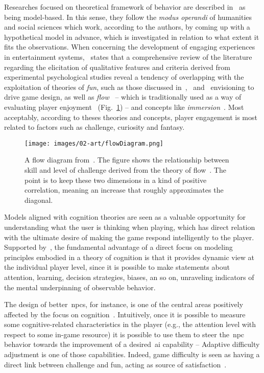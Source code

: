 Researches focused on theoretical framework of behavior are described in~\cite{yannakakis_player_2013} as being model-based. In this sense, they follow the \textit{modus operandi} of humanities and social sciences which work, according to the authors, by coming up with a hypothetical model in advance, which is investigated in relation to what extent it fits the observations. When concerning the development of engaging experiences in entertainment systems,~\cite{yannakakis_how_2008} states that a comprehensive review of the literature regarding the elicitation of qualitative features and criteria derived from experimental psychological studies reveal a tendency of overlapping with the exploitation of theories of \textit{fun}, such as those discussed in~\cite{malone_what_1980},~\cite{lazzaro_why_2004} and~\cite{koster_theory_2013} envisioning to drive game design, as well as \textit{flow}~\citep{csikszentmihalyi_flow:_1991} -- which is traditionally used as a way of evaluating player enjoyment~\citep{sweetser_gameflow:_2005, cowley_toward_2008} (Fig.~\ref{flowDiagram}) -- and concepts like \textit{immersion}~\citep{calleja_digital_2007}. Most acceptably, according to theses theories and concepts, player engagement is most related to factors such as challenge, curiosity and fantasy.

\begin{figure}[htp]
  \centering  
  \texttt{[image: images/02-art/flowDiagram.png]}
  \caption{A flow diagram from~\cite{hunicke_ai_2004}. The figure shows the relationship between skill and level of challenge derived from the theory of flow~\citep{csikszentmihalyi_flow:_1991}. The point is to keep these two dimensions in a kind of positive correlation, meaning an increase that roughly approximates the diagonal.}
  \label{flowDiagram}
\end{figure}

Models aligned with cognition theories are seen as a valuable opportunity for understanding what the user is thinking when playing, which has direct relation with the ultimate desire of making the game respond intelligently to the player. Supported by~\cite{bohil_cognitive_2007}, the fundamental advantage of a direct focus on modeling principles embodied in a theory of cognition is that it provides dynamic view at the individual player level, since it is possible to make statements about attention, learning, decision strategies, biases, an so on, unraveling indicators of the mental underpinning of observable behavior. 

The design of better~\gls{npc}s, for instance, is one of the central areas positively affected by the focus on cognition~\citep{funge_ai_1999}. Intuitively, once it is possible to measure some cognitive-related characteristics in the player (e.g., the attention level with respect to some in-game resource) it is possible to use them to steer the~\gls{npc} behavior towards the improvement of a desired~\gls{ai} capability -- Adaptive difficulty adjustment is one of those capabilities. Indeed, game difficulty is seen as having a direct link between challenge and fun, acting as source of satisfaction~\citep{koster_theory_2013,yannakakis_modeling_2006}. 

